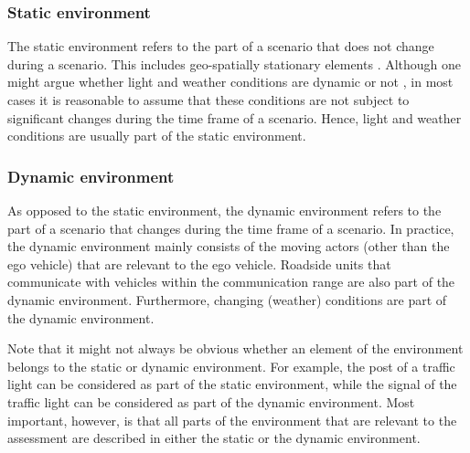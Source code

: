 
\subsubsection{Static environment}
\label{sec:static environment}
The static environment refers to the part of a scenario that does not change during a scenario. This includes geo-spatially stationary elements \cite{ulbrich2015}. Although one might argue whether light and weather conditions are dynamic or not \cite{geyer2014,bach2016modelbased}, in most cases it is reasonable to assume that these conditions are not subject to significant changes during the time frame of a scenario. 
Hence, light and weather conditions are usually part of the static environment.

\subsubsection{Dynamic environment}
\label{sec:dynamic environment}
As opposed to the static environment, the dynamic environment refers to the part of a scenario that changes during the time frame of a scenario. 
In practice, the dynamic environment mainly consists of the moving actors (other than the ego vehicle) that are relevant to the ego vehicle. 
Roadside units that communicate with vehicles within the communication range \cite{alsultan2014comprehensive} are also part of the dynamic environment. Furthermore, changing (weather) conditions are part of the dynamic environment.

Note that it might not always be obvious whether an element of the environment belongs to the static or dynamic environment. For example, the post of a traffic light can be considered as part of the static environment, while the signal of the traffic light can be considered as part of the dynamic environment. Most important, however, is that all parts of the environment that are relevant to the assessment are described in either the static or the dynamic environment.

